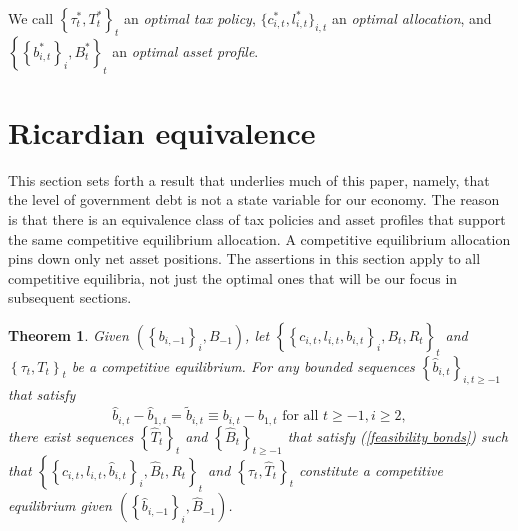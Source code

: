 \documentclass[11.5pt,twoside]{article}
\newtheorem{theorem}{Theorem}
\begin{document}
\smallskip We  call $\left \{ \tau _{t}^{\ast },T_{t}^{\ast }\right \}
_{t}$ an \textit{optimal tax policy}, $\{c_{i,t}^{\ast },l_{i,t}^{\ast
}\}_{i,t}$ an \textit{optimal allocation}, and $\left \{ \left \{
b_{i,t}^{\ast }\right \} _{i},B_{t}^{\ast }\right \} _{t}$ an \textit{%
optimal asset profile}.

\section{\protect\smallskip Ricardian equivalence \label{sec:Ricardian101}}
%
This section sets forth  a  result that underlies much of this paper, namely, that  the level
of government debt is not a state variable for our economy.  The reason is that there is an equivalence class of tax policies and asset profiles that support the same competitive equilibrium allocation.
A competitive  equilibrium allocation pins down only net asset  positions.
The assertions in this section apply to all competitive equilibria, not just the optimal ones that will be our focus in subsequent sections.


\begin{theorem}
\label{theorem: main} Given $\left( \left \{ b_{i,-1}\right \}
_{i},B_{-1}\right) $, let $\left \{ \left \{ c_{i,t},l_{i,t},b_{i,t}\right \} _{i},B_{t},R_{t}\right \} _{t} $ and $\left \{ \tau _{t},T_{t}\right
\} _{t}$ be a competitive equilibrium. For any bounded sequences $%
\left \{ \hat{b}_{i,t}\right \} _{i,t\geq -1}$ that satisfy
\begin{equation*}
\hat{b}_{i,t}-\hat{b}_{1,t}=\tilde{b}_{i,t}\equiv b_{i,t}	-b_{1,t}\text{ for all }t\geq -1,i\geq 2,
\end{equation*}%
there exist  sequences $\left \{ \hat{T}_{t}\right \} _{t}$ and $%
\left \{ \hat{B}_{t}\right \} _{t\geq -1}$ that satisfy (\ref{feasibility
bonds}) such that $\left \{ \left \{ c_{i,t},l_{i,t},\hat{b}%
_{i,t}\right \} _{i},\hat{B}_{t},R_{t}\right \} _{t}$ and $\left \{
\tau _{t},\hat{T}_{t}\right \} _{t}$ constitute a competitive
equilibrium given $\left( \left \{ \hat{b}_{i,-1}\right \} _{i},\hat{B}%
_{-1}\right) $.
\end{theorem}
\end{document}
